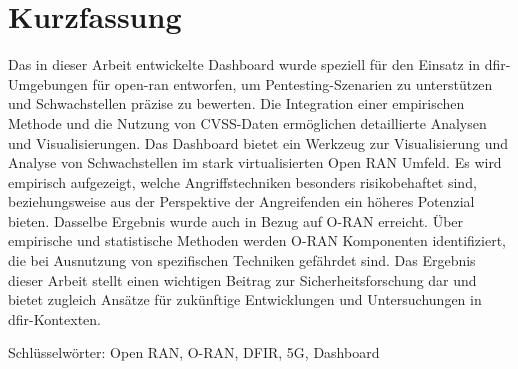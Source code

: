 \chapter*{Kurzfassung}
\label{chap:kurzfassung}
Das in dieser Arbeit entwickelte Dashboard wurde speziell für den Einsatz in \gls{dfir}-Umgebungen für \gls{open-ran} entworfen, um Pentesting-Szenarien zu unterstützen und Schwachstellen präzise zu bewerten. Die Integration einer empirischen Methode und die Nutzung von CVSS-Daten ermöglichen detaillierte Analysen und Visualisierungen. Das Dashboard bietet ein Werkzeug zur Visualisierung und Analyse von Schwachstellen im stark virtualisierten Open RAN Umfeld. Es wird empirisch aufgezeigt, welche Angriffstechniken besonders risikobehaftet sind, beziehungsweise aus der Perspektive der Angreifenden ein höheres Potenzial bieten. Dasselbe Ergebnis wurde auch in Bezug auf O-RAN erreicht. Über empirische und statistische Methoden werden O-RAN Komponenten identifiziert, die bei Ausnutzung von spezifischen Techniken gefährdet sind. Das Ergebnis dieser Arbeit stellt einen wichtigen Beitrag zur Sicherheitsforschung dar und bietet zugleich Ansätze für zukünftige Entwicklungen und Untersuchungen in \gls{dfir}-Kontexten.
\par Schlüsselwörter: Open RAN, O-RAN, DFIR, 5G, Dashboard